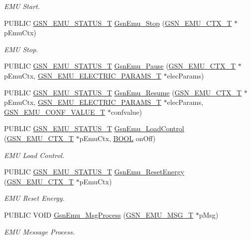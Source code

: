 \begin{DoxyCompactItemize}
\begin{DoxyCompactList}\small\item\em EMU Start. \end{DoxyCompactList}\item 
PUBLIC \hyperlink{a00490_aeda27e2bd7f74b1b9748e313d272033e}{GSN\_\-EMU\_\-STATUS\_\-T} \hyperlink{a00663_ga07157b87c6421781bd45756fd80d6702}{GsnEmu\_\-Stop} (\hyperlink{a00059}{GSN\_\-EMU\_\-CTX\_\-T} $\ast$pEmuCtx)
\begin{DoxyCompactList}\small\item\em EMU Stop. \end{DoxyCompactList}\item 
PUBLIC \hyperlink{a00490_aeda27e2bd7f74b1b9748e313d272033e}{GSN\_\-EMU\_\-STATUS\_\-T} \hyperlink{a00489_a76137a0514578f064701a5cb41ab5106}{GsnEmu\_\-Pause} (\hyperlink{a00059}{GSN\_\-EMU\_\-CTX\_\-T} $\ast$pEmuCtx, \hyperlink{a00060}{GSN\_\-EMU\_\-ELECTRIC\_\-PARAMS\_\-T} $\ast$elecParams)
\item 
PUBLIC \hyperlink{a00490_aeda27e2bd7f74b1b9748e313d272033e}{GSN\_\-EMU\_\-STATUS\_\-T} \hyperlink{a00489_a86ec9ec26f54baeb8bea7fa749046dd5}{GsnEmu\_\-Resume} (\hyperlink{a00059}{GSN\_\-EMU\_\-CTX\_\-T} $\ast$pEmuCtx, \hyperlink{a00060}{GSN\_\-EMU\_\-ELECTRIC\_\-PARAMS\_\-T} $\ast$elecParams, \hyperlink{a00058}{GSN\_\-EMU\_\-CONF\_\-VALUE\_\-T} $\ast$confvalue)
\item 
PUBLIC \hyperlink{a00490_aeda27e2bd7f74b1b9748e313d272033e}{GSN\_\-EMU\_\-STATUS\_\-T} \hyperlink{a00663_gacd69f0f8577c5a31988349642ce6b512}{GsnEmu\_\-LoadControl} (\hyperlink{a00059}{GSN\_\-EMU\_\-CTX\_\-T} $\ast$pEmuCtx, \hyperlink{a00660_ga1f04022c0a182c51c059438790ea138c}{BOOL} onOff)
\begin{DoxyCompactList}\small\item\em EMU Load Control. \end{DoxyCompactList}\item 
PUBLIC \hyperlink{a00490_aeda27e2bd7f74b1b9748e313d272033e}{GSN\_\-EMU\_\-STATUS\_\-T} \hyperlink{a00663_ga5b8064675bb056aaa15341a826269048}{GsnEmu\_\-ResetEnergy} (\hyperlink{a00059}{GSN\_\-EMU\_\-CTX\_\-T} $\ast$pEmuCtx)
\begin{DoxyCompactList}\small\item\em EMU Reset Energy. \end{DoxyCompactList}\item 
PUBLIC VOID \hyperlink{a00663_gafe8f6ed1a40411f25e8564d98435ffa8}{GsnEmu\_\-MsgProcess} (\hyperlink{a00062}{GSN\_\-EMU\_\-MSG\_\-T} $\ast$pMsg)
\begin{DoxyCompactList}\small\item\em EMU Message Process. \end{DoxyCompactList}\item 

\end{DoxyCompactItemize}
